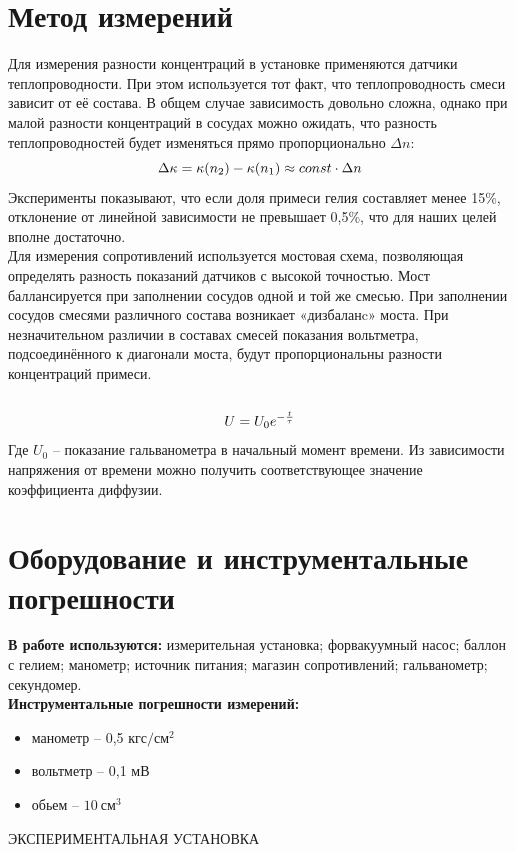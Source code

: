 \section{Метод измерений}
Для измерения разности концентраций в установке применяются датчики теплопроводности. При этом используется тот факт, что теплопроводность смеси зависит от её состава. В общем случае зависимость довольно сложна, однако при малой разности концентраций в сосудах можно ожидать, что разность теплопроводностей будет изменяться прямо пропорционально $\Delta n$:
\begin{equation*}
\Delta \kappa = \kappa (n_2) - \kappa (n_1) \approx const \cdot \Delta n\\
\end{equation*}
Эксперименты показывают, что если доля примеси гелия составляет менее 15\%, отклонение от линейной зависимости не превышает 0,5\%, что для наших целей вполне достаточно.\\
Для измерения сопротивлений используется мостовая схема, позволяющая определять разность показаний датчиков с высокой точностью. Мост баллансируется при заполнении сосудов одной и той же смесью. При заполнении сосудов смесями различного состава возникает «дизбаланc» моста. При незначительном различии в составах смесей показания вольтметра, подсоединённого к диагонали моста, будут пропорциональны разности концентраций примеси.\\\
\begin{equation*}
U = U_0 e^{-\frac{t}{\tau}}\\
\end{equation*}
Где $U_0$ -- показание гальванометра в начальный момент времени. Из зависимости напряжения от времени можно получить соответствующее значение коэффициента диффузии. \\
 \newpage
\section{Оборудование и инструментальные погрешности}

\textbf{В работе используются:} измерительная установка; форвакуумный насос; баллон с гелием; манометр; источник питания; магазин сопротивлений; гальванометр; секундомер.\\

\textbf{Инструментальные погрешности измерений:}\\
\begin{itemize}
\item манометр -- 0,5 $кгс/см^2$ \\
\item вольтметр -- 0,1 мВ\\
\item обьем -- $10 \ см^3$\\
\end{itemize}
\begin{center}
ЭКСПЕРИМЕНТАЛЬНАЯ УСТАНОВКА
\end{center}


